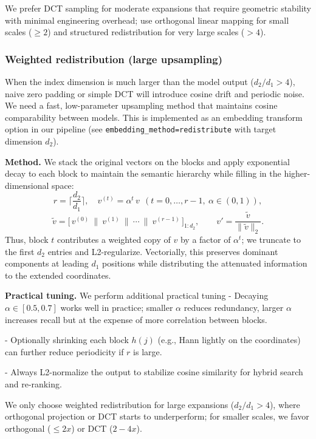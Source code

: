 \documentclass[10pt,twocolumn,letterpaper]{article}
\begin{document}
\vspace{0.5em}
We prefer DCT sampling for moderate expansions that require geometric stability with minimal engineering overhead; use orthogonal linear mapping for small scales ($\geq2$) and structured redistribution for very large scales ($>4$).

\subsubsection{Weighted redistribution (large upsampling)}

When the index dimension is much larger than the model output ($d_2/d_1>4$), naive zero padding or simple DCT will introduce cosine drift and periodic noise. We need a fast, low-parameter upsampling method that maintains cosine comparability between models. This is implemented as an embedding transform option in our pipeline (see \texttt{embedding\_method=redistribute} with target dimension $d_2$).

\textbf{Method.}
We stack the original vectors on the blocks and apply exponential decay to each block to maintain the semantic hierarchy while filling in the higher-dimensional space:
\[
r=\Big\lceil \frac{d_2}{d_1}\Big\rceil,\quad
v^{(t)}=\alpha^{t}\,v\ \ (t=0,\dots,r-1,\ \alpha\in(0,1)),
\]
\[
\tilde v=\big[\,v^{(0)}\ \|\ v^{(1)}\ \|\ \cdots\ \|\ v^{(r-1)}\,\big]_{1:d_2},\qquad
v'=\frac{\tilde v}{\lVert \tilde v\rVert_2}.
\]
Thus, block $t$ contributes a weighted copy of $v$ by a factor of $\alpha^t$; we truncate to the first $d_2$ entries and L2-regularize. Vectorially, this preserves dominant components at leading $d_1$ positions while distributing the attenuated information to the extended coordinates.

\vspace{0.5em}
\textbf{Practical tuning.} We perform additional practical tuning
- Decaying $\alpha\in[0.5,0.7]$ works well in practice; smaller $\alpha$ reduces redundancy, larger $\alpha$ increases recall but at the expense of more correlation between blocks.

- Optionally shrinking each block $h(j)$ (e.g., Hann lightly on the coordinates) can further reduce periodicity if $r$ is large.

- Always L2-normalize the output to stabilize cosine similarity for hybrid search and re-ranking.

\vspace{0.5em}
We only choose weighted redistribution for large expansions ($d_2/d_1>4$), where orthogonal projection or DCT starts to underperform; for smaller scales, we favor orthogonal ($\leq 2x$) or DCT ($2-4x$).
\end{document}
